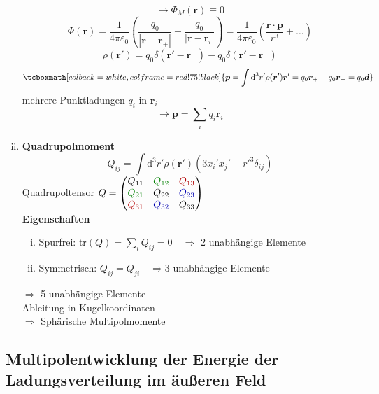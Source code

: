 \documentclass[titlepage,11pt,a4paper,ngerman]{report}
\newcommand{\tx}[1]{\textrm{#1}}
\newcommand{\dd}{\tx{d}}
\renewcommand{\Phi}{\varPhi}
\renewcommand{\vec}[1]{\boldsymbol{#1}}
\renewcommand{\epsilon}{\varepsilon}
\newcommand{\rmbox}[1]{\tcboxmath[colback=white,colframe=red!75!black]{#1}}
\begin{document}
\begin{enumerate}[i)]
	\[\rightarrow\Phi_M(\vec{r})\equiv0\]
	\[\Phi(\vec{r})=\frac{1}{4\pi\epsilon_0}\left(\frac{q_0}{|\vec{r}-\vec{r}_+|}-\frac{q_0}{|\vec{r}-\vec{r}_i|}\right)=\frac{1}{4\pi\epsilon_0}\left(\frac{\vec{r}\cdot\vec{p}}{r^3}+\ldots\right)\]
	\[\rho(\vec{r}')=q_0\delta(\vec{r}'-\vec{r}_+)-q_0\delta(\vec{r}'-\vec{r}_-)\]
	\[\rmbox{\vec{p}=\int\dd^3r'\rho(\vec{r}')\vec{r}'=q_0\vec{r}_+-q_0\vec{r}_-=q_0\vec{d}}\]
	mehrere Punktladungen $q_i$ in $\vec{r}_i$\\
	\[\rightarrow\vec{p}=\sum_iq_i\vec{r}_i\]
	\item \textbf{Quadrupolmoment}
	\[Q_{ij}=\int\dd^3r'\rho(\vec{r}')(3x_i'x_j'-r'^3\delta_{ij})\]
	Quadrupoltensor $Q=\begin{pmatrix}Q_{11}& \color{black!50!green} Q_{12}& \color{black!30!red} Q_{13}\\\color{black!50!green} Q_{21} &Q_{22}& \color{black!30!blue} Q_{23}\\\color{black!30!red} Q_{31} & \color{black!30!blue} Q_{32} & Q_{33}\end{pmatrix}$\\ 
	\textbf{Eigenschaften}
	\begin{enumerate}[i)]
		\item Spurfrei: $\mathrm{tr}(Q)=\sum_iQ_{ij}=0 \quad \Rightarrow $ 2 unabhängige Elemente
		\item Symmetrisch: $Q_{ij}=Q_{ji} \quad \Rightarrow 3 $ unabhängige Elemente
	\end{enumerate}
	$\Rightarrow$ 5 unabhängige Elemente\\[5pt]
	
	Ableitung in Kugelkoordinaten\\
	$\Rightarrow$ Sphärische Multipolmomente
\end{enumerate}

\subsection{Multipolentwicklung der Energie der Ladungsverteilung im äußeren Feld}
\end{document}
